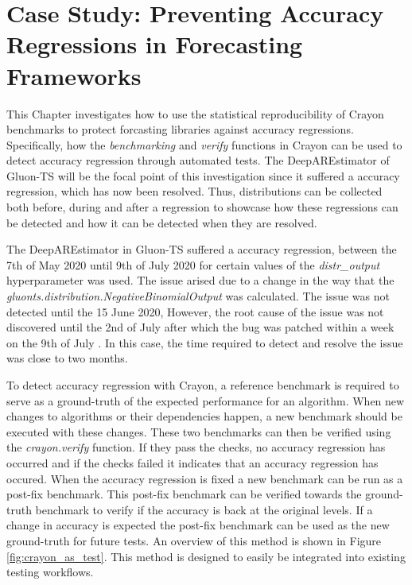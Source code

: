 
\chapter{Case Study: Preventing Accuracy Regressions in Forecasting Frameworks}
\label{cha:crayon_case_study}
This Chapter investigates how to use the statistical reproducibility of Crayon benchmarks to protect forcasting libraries against accuracy regressions. Specifically, how the \textit{benchmarking} and \textit{verify} functions in Crayon can be used to detect accuracy regression through automated tests. The DeepAREstimator of Gluon-TS will be the focal point of this investigation since it suffered a accuracy regression, which has now been resolved. Thus, distributions can be collected both before, during and after a regression to showcase how these regressions can be detected and how it can be detected when they are resolved.

The DeepAREstimator in Gluon-TS suffered a accuracy regression, between the 7th of May 2020 until 9th of July 2020 for certain values of the \textit{distr\_output} hyperparameter was used. The issue arised due to a change in the way that the \textit{gluonts.distribution.NegativeBinomialOutput} was calculated. The issue was not detected until the 15 June 2020, However, the root cause of the issue was not discovered until the 2nd of July after which the bug was patched within a week on the 9th of July \cite{gluonts_deepar_bugged, gluonts_deepar_bugged_found, gluonts_deepar_patched}. In this case, the time required to detect and resolve the issue was close to two months.

To detect accuracy regression with Crayon, a reference benchmark is required to serve as a ground-truth of the expected performance for an algorithm. When new changes to algorithms or their dependencies happen, a new benchmark should be executed with these changes. These two benchmarks can then be verified using the \textit{crayon.verify} function. If they pass the checks, no accuracy regression has occurred and if the checks failed it indicates that an accuracy regression has occured. When the accuracy regression is fixed a new benchmark can be run as a post-fix benchmark. This post-fix benchmark can be verified towards the ground-truth benchmark to verify if the accuracy is back at the original levels. If a change in accuracy is expected the post-fix benchmark can be used as the new ground-truth for future tests. An overview of this method is shown in Figure \ref{fig:crayon_as_test}. This method is designed to easily be integrated into existing testing workflows.

